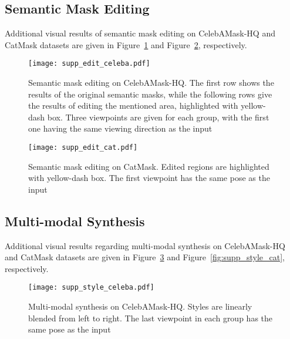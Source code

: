 \documentclass[runningheads]{llncs}
\begin{document}
\clearpage


\subsection{Semantic Mask Editing} \label{sec:supp_edit}

Additional visual results of semantic mask editing on CelebAMask-HQ and CatMask datasets are given in Figure~\ref{fig:supp_edit_celeba} and Figure~\ref{fig:supp_edit_cat}, respectively. 

\begin{figure}[h!]
    \centering
    \texttt{[image: supp\_edit\_celeba.pdf]}
    \vspace{-3mm}
    \caption{Semantic mask editing on CelebAMask-HQ. The first row shows the results of the original semantic masks, while the following rows give the results of editing the mentioned area, highlighted with yellow-dash box. Three viewpoints are given for each group, with the first one having the same viewing direction as the input}
    \vspace{-3mm}
    \label{fig:supp_edit_celeba}
\end{figure}


\begin{figure}[h!]
    \centering
    \texttt{[image: supp\_edit\_cat.pdf]}
    \vspace{-3mm}
    \caption{Semantic mask editing on CatMask. Edited regions are highlighted with yellow-dash box. The first viewpoint has the same pose as the input}
    \vspace{-3mm}
    \label{fig:supp_edit_cat}
\end{figure}





\subsection{Multi-modal Synthesis} \label{sec:supp_style}


Additional visual results regarding multi-modal synthesis on CelebAMask-HQ and CatMask datasets are given in Figure~\ref{fig:supp_style_celeba} and Figure~\ref{fig:supp_style_cat}, respectively.

\begin{figure}[t!]
    \centering
    \texttt{[image: supp\_style\_celeba.pdf]}
    \vspace{-3mm}
    \caption{Multi-modal synthesis on CelebAMask-HQ. Styles are linearly blended from left to right. The last viewpoint in each group has the same pose as the input}
    \vspace{-3mm}
    \label{fig:supp_style_celeba}
\end{figure}
\end{document}

